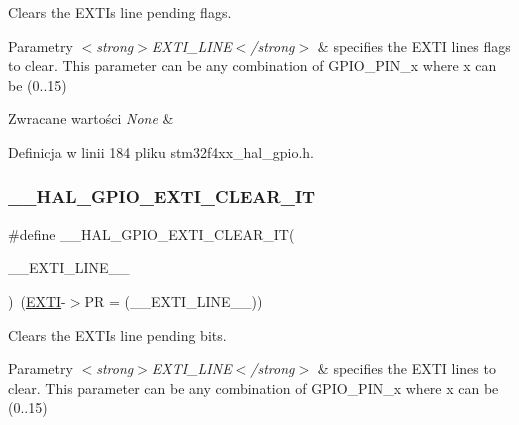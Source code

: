 Clears the E\+X\+TI\textquotesingle{}s line pending flags. 


\begin{DoxyParams}{Parametry}
{\em $<$strong$>$\+E\+X\+T\+I\+\_\+\+L\+I\+N\+E$<$/strong$>$} & specifies the E\+X\+TI lines flags to clear. This parameter can be any combination of G\+P\+I\+O\+\_\+\+P\+I\+N\+\_\+x where x can be (0..15) \\
\hline
\end{DoxyParams}

\begin{DoxyRetVals}{Zwracane wartości}
{\em None} & \\
\hline
\end{DoxyRetVals}


Definicja w linii 184 pliku stm32f4xx\+\_\+hal\+\_\+gpio.\+h.

\mbox{\label{group___g_p_i_o___exported___macros_ga2a086506eec826f49b200fba64beb9f1}} 
\subsubsection{\texorpdfstring{\+\_\+\+\_\+\+H\+A\+L\+\_\+\+G\+P\+I\+O\+\_\+\+E\+X\+T\+I\+\_\+\+C\+L\+E\+A\+R\+\_\+\+IT}{\_\_HAL\_GPIO\_EXTI\_CLEAR\_IT}}
{\footnotesize\ttfamily \#define \+\_\+\+\_\+\+H\+A\+L\+\_\+\+G\+P\+I\+O\+\_\+\+E\+X\+T\+I\+\_\+\+C\+L\+E\+A\+R\+\_\+\+IT(\begin{DoxyParamCaption}\item[{}]{\+\_\+\+\_\+\+E\+X\+T\+I\+\_\+\+L\+I\+N\+E\+\_\+\+\_\+ }\end{DoxyParamCaption})~(\hyperlink{group___peripheral__declaration_ga9189e770cd9b63dadd36683eb9843cac}{E\+X\+TI}-\/$>$PR = (\+\_\+\+\_\+\+E\+X\+T\+I\+\_\+\+L\+I\+N\+E\+\_\+\+\_\+))}



Clears the E\+X\+TI\textquotesingle{}s line pending bits. 


\begin{DoxyParams}{Parametry}
{\em $<$strong$>$\+E\+X\+T\+I\+\_\+\+L\+I\+N\+E$<$/strong$>$} & specifies the E\+X\+TI lines to clear. This parameter can be any combination of G\+P\+I\+O\+\_\+\+P\+I\+N\+\_\+x where x can be (0..15) \\
\hline
\end{DoxyParams}

